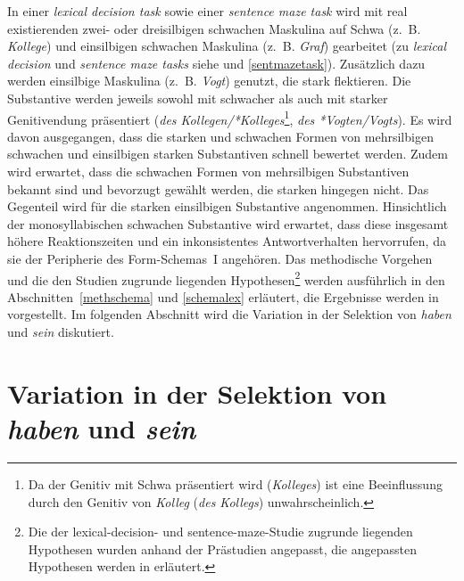 In einer \textit{lexical decision task} sowie einer \textit{sentence maze task} wird mit real existierenden zwei- oder dreisilbigen schwachen Maskulina auf Schwa (z.~B. \textit{Kollege}) und einsilbigen schwachen Maskulina (z.~B. \textit{Graf}) gearbeitet (zu \textit{lexical decision} und \textit{sentence maze tasks} siehe  und \ref{sentmazetask}). Zusätzlich dazu werden einsilbige Maskulina (z.~B. \textit{Vogt}) genutzt, die stark flektieren. Die Substantive werden jeweils sowohl mit schwacher als auch mit starker Genitivendung präsentiert (\textit{des Kollegen/*Kolleges}\footnote{Da der Genitiv mit Schwa präsentiert wird (\textit{Kolleges}) ist eine Beeinflussung durch den Genitiv von \textit{Kolleg} (\textit{des Kollegs}) unwahrscheinlich.}, \textit{des *Vogten/Vogts}). Es wird davon ausgegangen, dass die starken und schwachen Formen von mehrsilbigen schwachen und einsilbigen starken Substantiven schnell bewertet werden. Zudem wird erwartet, dass die schwachen Formen von mehrsilbigen Substantiven bekannt sind und bevorzugt gewählt werden, die starken hingegen nicht. Das Gegenteil wird für die starken einsilbigen Substantive angenommen. Hinsichtlich der monosyllabischen schwachen Substantive wird erwartet, dass diese insgesamt höhere Reaktionszeiten und ein inkonsistentes Antwortverhalten hervorrufen, da sie der Peripherie des Form-Schemas~I angehören. Das methodische Vorgehen und die den Studien zugrunde liegenden Hypothesen\footnote{Die der lexical-decision- und sentence-maze-Studie zugrunde liegenden Hypothesen wurden anhand der Prästudien angepasst, die angepassten Hypothesen werden in  erläutert.} werden ausführlich in den Abschnitten~\ref{methschema} und \ref{schemalex}  erläutert, die Ergebnisse werden in  vorgestellt. 
Im folgenden Abschnitt wird die Variation in der Selektion von \textit{haben} und \textit{sein} diskutiert.

\section{Variation in der Selektion von \textit{haben} und \textit{sein}}\label{selektion}\largerpage

